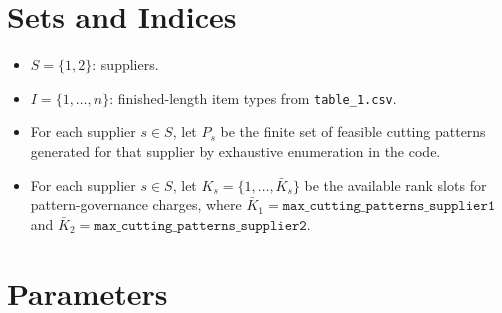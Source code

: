 \section*{Sets and Indices}

\begin{itemize}
    \item $S=\{1,2\}$: suppliers.
    \item $I=\{1,\dots,n\}$: finished-length item types from \texttt{table\_1.csv}.
    \item For each supplier $s\in S$, let $P_s$ be the finite set of feasible cutting patterns generated for that supplier by exhaustive enumeration in the code.
    \item For each supplier $s\in S$, let $K_s=\{1,\dots,\bar K_s\}$ be the available rank slots for pattern-governance charges, where
    $\bar K_1=\texttt{max\_cutting\_patterns\_supplier1}$ and
    $\bar K_2=\texttt{max\_cutting\_patterns\_supplier2}$.
\end{itemize}

\section*{Parameters}

